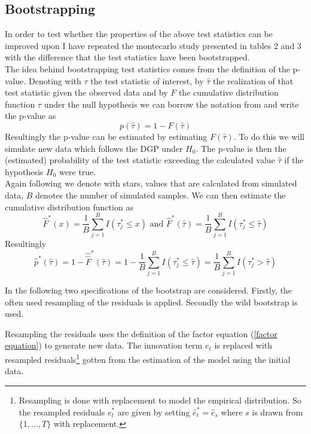 \documentclass[11pt]{article}
\begin{document}
\subsection{Bootstrapping \citet{breitung2011testing}}
In order to test whether the properties of the above test statistics can be improved upon I have repeated the montecarlo study presented in \citet{breitung2011testing} tables 2 and 3 with the difference that the test statistics have been bootstrapped. \\

The idea behind bootstrapping test statistics comes from the definition of the p-value. Denoting with $\tau$ the test statistic of interest, by $\hat \tau$ the realization of that test statistic given the observed data and by $F$ the cumulative distribution function $\tau$ under the null hypothesis we can borrow the notation from \citet{davidson2004econometric} and write the p-value as
$$p(\hat \tau) = 1 - F(\hat \tau)$$
Resultingly the p-value can be estimated by estimating $F(\hat \tau)$. To do this we will simulate new data which follows the DGP under $H_0$. The p-value is then the (estimated) probability of the test statistic exceeding the calculated value $\hat \tau$ if the hypothesis $H_0$ were true. \\

Again following \citet{davidson2004econometric} we denote with stars, values that are calculated from simulated data, $B$ denotes the number of simulated samples. We can then estimate the cumulative distribution function as 
$$\hat F^*(x) = \frac{1}{B} \sum_{j=1}^B I(\tau^*_j \leq x) \text{ and } \hat F^*(\hat \tau) = \frac{1}{B} \sum_{j=1}^B I(\tau^*_j \leq \hat \tau)$$
Resultingly
$$\hat p^*(\hat \tau) = 1 - \hat \hat F^*(\hat \tau) = 1 - \frac{1}{B} \sum_{j=1}^B I (\tau^*_j \leq \hat \tau) = \frac{1}{B}\sum_{j=1}^B I(\tau^*_j > \hat \tau)$$

In the following two specifications of the bootstrap are considered. Firstly, the often used resampling of the residuals is applied. Secondly the wild bootstrap is used. 

Resampling the residuals uses the definition of the factor equation (\ref{factor equation}) to generate new data. The innovation term $e_t$ is replaced with resampled residuals\footnote{Resampling is done with replacement to model the empirical distribution. So the resampled residuals $e_t^*$ are given by setting $\hat e_t^* = \hat e_s$ where $s$ is drawn from $\{1, ..., T\}$ with replacement.} gotten from the estimation of the model using the initial data.
\end{document}
